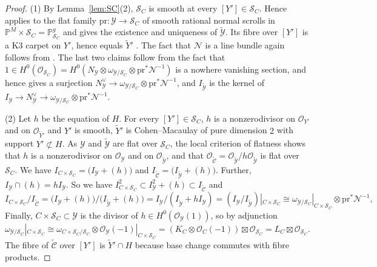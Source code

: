 \documentclass[11pt,reqno]{amsart}
\theoremstyle{plain}
\theoremstyle{definition}
\newcommand{\PP}{\mathbb{P}}
\newcommand{\PM}{\mathbb{P}^M}
\newcommand{\OO}{\mathcal{O}}
\newcommand{\Yt}{\widetilde{Y}}
\newcommand{\SC}{\mathcal{S}_C}
\newcommand{\cY}{\mathcal{Y}}
\newcommand{\cYt}{\widetilde{\mathcal{Y}}}
\newcommand{\cCt}{\widetilde{\mathcal{C}}}
\newcommand{\cN}{\mathcal{N}}
\newcommand{\pr}{\mathrm{pr}}
\begin{document}
\begin{proof}
(1) By Lemma~\ref{lem:SC}(2), $\SC$ is smooth at every $[Y']\in\SC$. Hence \cite[Prop.~3.7]{GP97} applies to the flat family $\pr\colon\cY\to\SC$ of smooth rational normal scrolls in $\PM\times\SC=\PP^g_{\SC}$ and gives the existence and uniqueness of $\cYt$. Its fibre over $[Y']$ is a K3 carpet on $Y'$, hence equals $\Yt'$ \cite[Prop.~1.7]{GP97}. The fact that $\cN$ is a line bundle again follows from \cite[Prop.~1.7]{GP97}. The last two claims follow from the fact that $1\in H^0(\OO_{\SC})=H^0(N_{\cY}\otimes\omega_{\cY/\SC}\otimes\pr^*\cN^{-1})$ is a nowhere vanishing section, and hence gives a surjection $N_{\cY}^{\vee}\to\omega_{\cY/\SC}\otimes\pr^*\cN^{-1}$, and $I_{\cYt}$ is the kernel of $I_{\cY}\to N_{\cY}^{\vee}\to\omega_{\cY/\SC}\otimes\pr^*\cN^{-1}$.

(2) Let $h$ be the equation of $H$. For every $[Y']\in\SC$, $h$ is a nonzerodivisor on $\OO_{Y'}$ and on $\OO_{\Yt'}$ and $Y'$ is smooth, $\Yt'$ is Cohen--Macaulay of pure dimension $2$ with support $Y'\not\subset H$. As $\cY$ and $\cYt$ are flat over $\SC$, the local criterion of flatness \cite[Cor.\ to Thm.~22.5]{Mat89} shows that $h$ is a nonzerodivisor on $\OO_{\cY}$ and on $\OO_{\cYt}$, and that $\OO_{\cCt}=\OO_{\cYt}/h\OO_{\cYt}$ is flat over $\SC$. We have $I_{C\times\SC} = \big(I_{\cY}+(h)\big)$ and $I_{\cCt} = \big(I_{\cYt}+(h)\big)$. Further, $I_{\cY}\cap(h)=hI_{\cY}$. So we have $I_{C\times\SC}^2\subset I_{\cY}^2+(h)\subset I_{\cCt}$ and
\[
I_{C\times\SC}/I_{\cCt}=\big(I_{\cY}+(h)\big)/\big(I_{\cYt}+(h)\big)=I_{\cY}/(I_{\cYt}+hI_{\cY})=(I_{\cY}/I_{\cYt})|_{C\times\SC}\cong\omega_{\cY/\SC}|_{C\times\SC}\otimes\pr^*\cN^{-1},
\]
Finally, $C\times\SC\subset\cY$ is the divisor of $h\in H^0(\OO_{\cY}(1))$, so by adjunction $\omega_{\cY/\SC}|_{C\times\SC}\cong\omega_{C\times\SC/\SC}\otimes\OO_{\cY}(-1)|_{C\times\SC}=(K_C\otimes\OO_C(-1))\boxtimes\OO_{\SC}=L_C\boxtimes\OO_{\SC}$. The fibre of $\cCt$ over $[Y']$ is $\Yt'\cap H$ because base change commutes with fibre products.


\end{proof}
\end{document}
